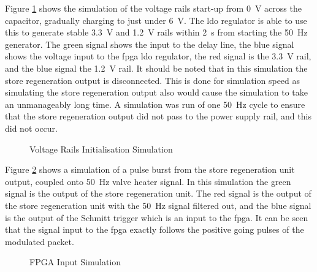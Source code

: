 Figure \ref{fig:psu-init} shows the simulation of the voltage rails start-up from \SI{0}{\volt} across the capacitor, gradually charging to just under \SI{6}{\volt}. The \gls{ldo} regulator is able to use this to generate stable \SI{3.3}{\volt} and \SI{1.2}{\volt} rails within \SI{2}{\second} from starting the \SI{50}{\hertz} generator. The green signal shows the input to the delay line, the blue signal shows the voltage input to the \gls{fpga} \gls{ldo} regulator, the red signal is the \SI{3.3}{\volt} rail, and the blue signal the \SI{1.2}{\volt} rail. It should be noted that in this simulation the store regeneration output is disconnected. This is done for simulation speed as simulating the store regeneration output also would cause the simulation to take an unmanageably long time. A simulation was run of one \SI{50}{\hertz} cycle to ensure that the store regeneration output did not pass to the power supply rail, and this did not occur.

\begin{figure}[ht]
	\centering
	\caption{Voltage Rails Initialisation Simulation}
	\label{fig:psu-init}
\end{figure}

Figure \ref{fig:fpga-input-sim} shows a simulation of a pulse burst from the store regeneration unit output, coupled onto \SI{50}{\hertz} valve heater signal. In this simulation the green signal is the output of the store regeneration unit. The red signal is the output of the store regeneration unit with the \SI{50}{\hertz} signal filtered out, and the blue signal is the output of the Schmitt trigger which is an input to the \gls{fpga}. It can be seen that the signal input to the \gls{fpga} exactly follows the positive going pulses of the modulated packet.


\begin{figure}[ht]
	\centering
	\caption{FPGA Input Simulation}
	\label{fig:fpga-input-sim}
\end{figure}

